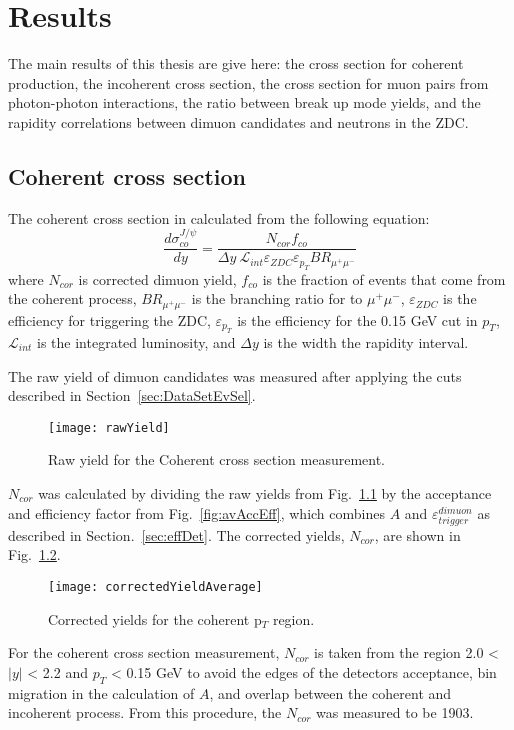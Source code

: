
\chapter{Results} 
  The main results of this thesis are give here:
    the cross section for coherent \JPsi production, the incoherent \JPsi cross
    section, the cross section for muon pairs from photon-photon interactions,
    the ratio between break up mode yields, and the rapidity correlations 
    between dimuon candidates and neutrons in the ZDC.

  \section{Coherent cross section}
  The coherent cross section in calculated from the following equation:
  \begin{equation}
    \frac{d\sigma^{J/\psi}_{co}}{dy}  = \frac{N_{cor} f_{co}  }
    { \Delta y~\mathcal{L}_{int} \varepsilon_{ZDC} \varepsilon_{p_{T}} 
      BR_{\mu^{+}\mu^{-}}}
    \label{eq:expXSecCo}
   \end{equation}
   where $N_{cor}$ is corrected dimuon yield, $f_{co}$ is the 
     fraction of events that come from the coherent process, 
     $BR_{\mu^{+}\mu^{-}}$ is the branching ratio for \JPsi to $\mu^{+}\mu^{-}$, 
     $\varepsilon_{ZDC}$ is the efficiency for triggering the ZDC, 
     $\varepsilon_{p_{T}}$ is the efficiency for the 0.15 GeV cut in $p_{T}$, 
     $\mathcal{L}_{int}$ is the integrated luminosity, and $\Delta y$ is the 
     width the rapidity interval.

  The raw yield of dimuon candidates was measured after applying the cuts 
    described in Section~\ref{sec:DataSetEvSel}.
  \begin{figure}[!Hhtb]
    \centering
    \texttt{[image: rawYield]}
    \caption{Raw yield for the Coherent cross section measurement.}
    \label{fig:rawYieldCo}
  \end{figure}
  $N_{cor}$ was calculated by dividing the raw yields from 
    Fig.~\ref{fig:rawYieldCo} by the acceptance and efficiency factor from 
    Fig.~\ref{fig:avAccEff}, which combines $A$ and 
    $\varepsilon^{dimuon}_{trigger}$ as described in Section.~\ref{sec:effDet}.
  The corrected yields, $N_{cor}$, are shown in Fig.~\ref{fig:corYieldCo}.
  \begin{figure}[!Hhtb]
    \centering
    \texttt{[image: correctedYieldAverage]}
    \caption{Corrected yields for the coherent p$_{T}$ region.}
    \label{fig:corYieldCo}
  \end{figure}
  For the coherent cross section measurement, $N_{cor}$ is taken from the 
    region 2.0 < $|y|$ < 2.2 and $p_{T}$ < 0.15 GeV to avoid the edges of the
    detectors acceptance, bin migration in the calculation of $A$, and overlap
    between the coherent and incoherent process.
  From this procedure, the $N_{cor}$ was measured to be 1903.
  
